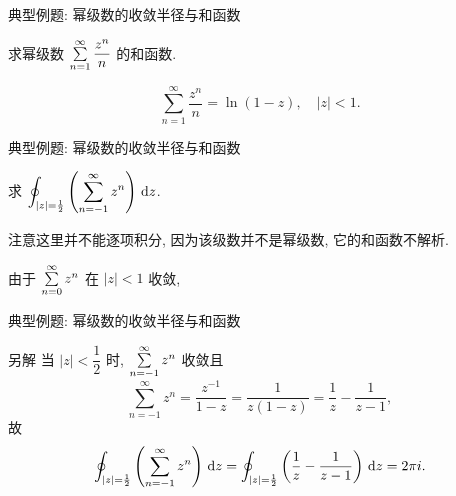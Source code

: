 \begin{frame}{典型例题: 幂级数的收敛半径与和函数}
\onslide<+->
\begin{exercise}
求幂级数 $\sum\limits_{n=1}^\infty\dfrac{z^n}n$ 的和函数.
\end{exercise}
\onslide<+->
\begin{answer}
\[\sum_{n=1}^\infty\frac{z^n}n=\ln(1-z),\quad|z|<1.\]
\end{answer}
\end{frame}


\begin{frame}{典型例题: 幂级数的收敛半径与和函数}
\onslide<+->
\begin{example}
求 $\displaystyle\oint_{|z|=\frac12}\left(\sum_{n=-1}^\infty z^n\right)\,\mathrm{d} z$.
\end{example}
\onslide<+->
注意这里并不能逐项积分, 因为该级数并不是幂级数, 它的和函数不解析.
\begin{solution}
由于 $\sum\limits_{n=0}^\infty z^n$ 在 $|z|<1$ 收敛,
\end{solution}
\end{frame}


\begin{frame}{典型例题: 幂级数的收敛半径与和函数}
\beqskip{3pt}
\onslide<+->
\begin{block}{另解}
当 $|z|<\dfrac12$ 时, $\sum\limits_{n=-1}^\infty z^n$ 收敛且
\[\sum_{n=-1}^\infty z^n=\frac{z^{-1}}{1-z}=\frac1{z(1-z)}=\frac1z-\frac1{z-1},\]
\onslide<+->
故
\[\oint_{|z|=\frac12}\left(\sum_{n=-1}^\infty z^n\right)\,\mathrm{d} z
=\oint_{|z|=\frac12}\left(\frac1z-\frac1{z-1}\right)\,\mathrm{d} z=2\pi i.\]
\end{block}
\endgroup
\end{frame}
